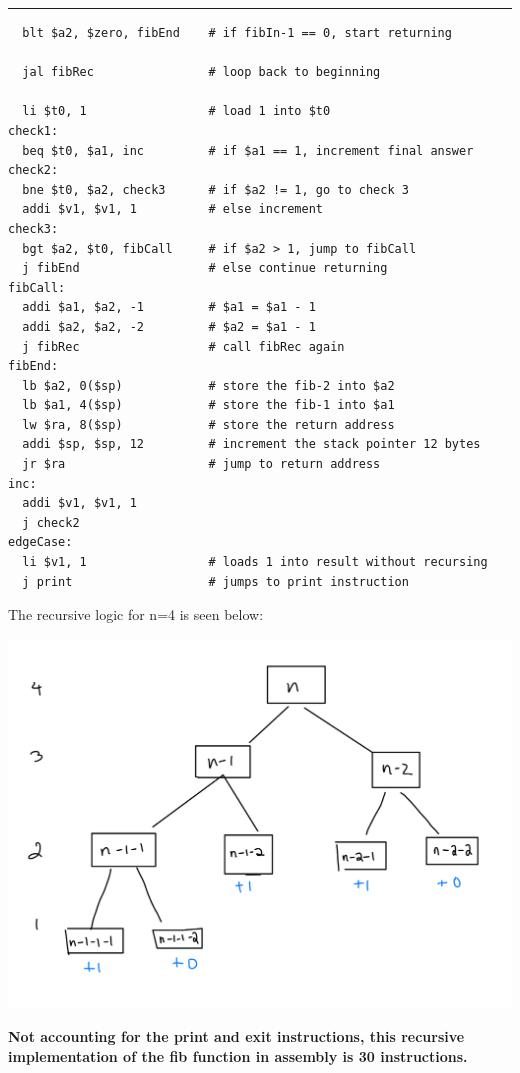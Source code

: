 \documentclass[11pt]{exam}
\newcounter{questionCounter}
\newcounter{partCounter}[questionCounter]
\newenvironment{namedquestion}[1]{%
    \addtocounter{questionCounter}{1}%
    \setcounter{partCounter}{0}%
    \vspace{.2in}%
        \noindent{\bf #1}%
    \vspace{0.3em} \hrule \vspace{.1in}%
}{}
\begin{document}
\begin{namedquestion}{Question 2.31}
\begin{verbatim}
  blt $a2, $zero, fibEnd    # if fibIn-1 == 0, start returning
  
  jal fibRec                # loop back to beginning
  
  li $t0, 1                 # load 1 into $t0  
check1:
  beq $t0, $a1, inc         # if $a1 == 1, increment final answer
check2: 
  bne $t0, $a2, check3      # if $a2 != 1, go to check 3
  addi $v1, $v1, 1          # else increment
check3: 
  bgt $a2, $t0, fibCall     # if $a2 > 1, jump to fibCall
  j fibEnd                  # else continue returning
fibCall:
  addi $a1, $a2, -1         # $a1 = $a1 - 1
  addi $a2, $a2, -2         # $a2 = $a1 - 1
  j fibRec                  # call fibRec again
fibEnd:
  lb $a2, 0($sp)            # store the fib-2 into $a2
  lb $a1, 4($sp)            # store the fib-1 into $a1
  lw $ra, 8($sp)            # store the return address
  addi $sp, $sp, 12         # increment the stack pointer 12 bytes
  jr $ra                    # jump to return address
inc:
  addi $v1, $v1, 1      
  j check2   
edgeCase:
  li $v1, 1                 # loads 1 into result without recursing
  j print                   # jumps to print instruction
\end{verbatim}
\newpage
The recursive logic for n=4 is seen below: 

\begin{center}
  \includegraphics[scale=0.30]{etc/lab3-rec.png}
\end{center}

\textbf{Not accounting for the print and exit instructions, this recursive implementation of the fib function in assembly is 30 instructions.}

\end{namedquestion}
\end{document}
